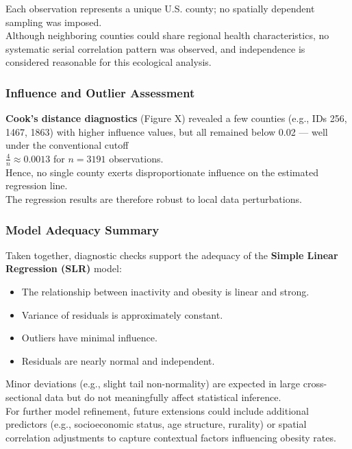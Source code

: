 \documentclass[
  letterpaper,
  DIV=11,
  numbers=noendperiod]{scrartcl}
\providecommand{\tightlist}{%
  \setlength{\itemsep}{0pt}\setlength{\parskip}{0pt}}\usepackage{longtable,booktabs,array}
\begin{document}
Each observation represents a unique U.S. county; no spatially dependent
sampling was imposed.\\
Although neighboring counties could share regional health
characteristics, no systematic serial correlation pattern was observed,
and independence is considered reasonable for this ecological analysis.

\subsubsection{Influence and Outlier
Assessment}\label{influence-and-outlier-assessment}

\textbf{Cook's distance diagnostics} (Figure X) revealed a few counties
(e.g., IDs 256, 1467, 1863) with higher influence values, but all
remained below 0.02 --- well under the conventional cutoff\\
\(\displaystyle \frac{4}{n} \approx 0.0013\) for \(n = 3191\)
observations.\\
Hence, no single county exerts disproportionate influence on the
estimated regression line.\\
The regression results are therefore robust to local data perturbations.

\subsubsection{Model Adequacy Summary}\label{model-adequacy-summary}

Taken together, diagnostic checks support the adequacy of the
\textbf{Simple Linear Regression (SLR)} model:

\begin{itemize}
\tightlist
\item
  The relationship between inactivity and obesity is linear and
  strong.\\
\item
  Variance of residuals is approximately constant.\\
\item
  Outliers have minimal influence.\\
\item
  Residuals are nearly normal and independent.
\end{itemize}

Minor deviations (e.g., slight tail non-normality) are expected in large
cross-sectional data but do not meaningfully affect statistical
inference.\\
For further model refinement, future extensions could include additional
predictors (e.g., socioeconomic status, age structure, rurality) or
spatial correlation adjustments to capture contextual factors
influencing obesity rates.
\end{document}
